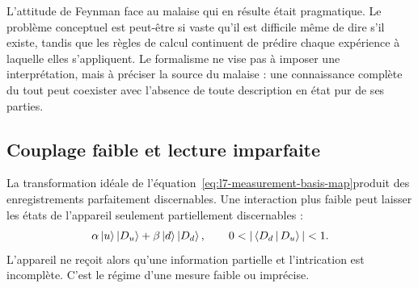 L’attitude de Feynman face au malaise qui en résulte était pragmatique. Le problème conceptuel est peut-être si vaste qu’il est difficile même de dire s’il existe, tandis que les règles de calcul continuent de prédire chaque expérience à laquelle elles s’appliquent. Le formalisme ne vise pas à imposer une interprétation, mais à préciser la source du malaise : une connaissance complète du tout peut coexister avec l’absence de toute description en état pur de ses parties.

\begin{classroomqa}
\end{classroomqa}

\begin{classroomqa}
\end{classroomqa}

\subsection{Couplage faible et lecture imparfaite}

La transformation idéale de l’équation~\eqref{eq:l7-measurement-basis-map}produit des enregistrements parfaitement discernables. Une interaction plus faible peut laisser les états de l’appareil seulement partiellement discernables :
\begin{equation}
\alpha\ket{u}\ket{D_u}
+\beta\ket{d}\ket{D_d},
\qquad
0<|\braket{D_d}{D_u}|<1.
\label{eq:l7-weak-measurement}
\end{equation}
L’appareil ne reçoit alors qu’une information partielle et l’intrication est incomplète. C’est le régime d’une mesure faible ou imprécise.

